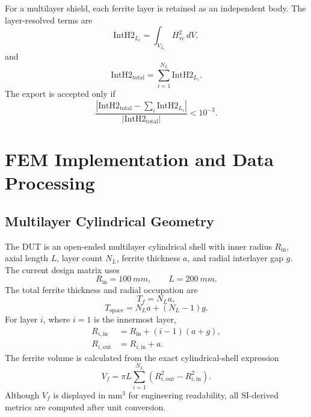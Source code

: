 \documentclass[letterpaper,journal]{IEEEtran}
\begin{document}
For a multilayer shield, each ferrite layer is retained as an independent body. The layer-resolved terms are
\begin{equation}
\mathrm{IntH2}_{L_i}=\int_{V_{L_i}}H_{\mathrm{vc}}^2\,dV,
\label{eq:inth2layer}
\end{equation}
and
\begin{equation}
\mathrm{IntH2}_{\mathrm{total}}=\sum_{i=1}^{N_L}\mathrm{IntH2}_{L_i}.
\label{eq:inth2total}
\end{equation}
The export is accepted only if
\begin{equation}
\frac{|\mathrm{IntH2}_{\mathrm{total}}-\sum_i\mathrm{IntH2}_{L_i}|}
{|\mathrm{IntH2}_{\mathrm{total}}|}<10^{-3}.
\label{eq:inth2check}
\end{equation}

\section{FEM Implementation and Data Processing}

\subsection{Multilayer Cylindrical Geometry}

The DUT is an open-ended multilayer cylindrical shell with inner radius $R_{\mathrm{in}}$, axial length $L$, layer count $N_L$, ferrite thickness $a$, and radial interlayer gap $g$. The current design matrix uses
\begin{equation}
R_{\mathrm{in}}=\SI{100}{mm},\qquad L=\SI{200}{mm}.
\label{eq:basicgeometry}
\end{equation}
The total ferrite thickness and radial occupation are
\begin{equation}
T_f=N_La,
\label{eq:tf}
\end{equation}
\begin{equation}
T_{\mathrm{space}}=N_La+(N_L-1)g.
\label{eq:tspace}
\end{equation}
For layer $i$, where $i=1$ is the innermost layer,
\begin{align}
R_{i,\mathrm{in}} &= R_{\mathrm{in}}+(i-1)(a+g),\\
R_{i,\mathrm{out}} &= R_{i,\mathrm{in}}+a.
\end{align}
The ferrite volume is calculated from the exact cylindrical-shell expression
\begin{equation}
V_f=\pi L\sum_{i=1}^{N_L}\left(R_{i,\mathrm{out}}^2-R_{i,\mathrm{in}}^2\right).
\label{eq:vf}
\end{equation}
Although $V_f$ is displayed in $\mathrm{mm^3}$ for engineering readability, all SI-derived metrics are computed after unit conversion.
\end{document}
